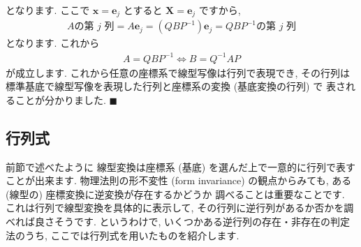 \documentclass[openany, a4paper, oneside]{book}
\theoremstyle{break}
\theoremstyle{breakdefn}
\newcommand{\bs}{\blacksquare}
\begin{document}
となります.
ここで $\bm{x} = \bm{e}_j$ とすると $\bm{X} = \bm{e}_j$ ですから,
    \begin{gather}
        A\text{の第 $j$ 列}
        =
        A \bm{e}_j
        =
        ( Q B P^{-1} ) \bm{e}_j
        =
        Q B P^{-1} \text{の第 $j$ 列}
    \end{gather}
となります.
これから
    \begin{gather}
        A
        =
        Q B P^{-1}
        \Longleftrightarrow
        B
        =
        Q^{-1} A P
    \label{eq:基底変換}
    \end{gather}
が成立します.
これから任意の座標系で線型写像は行列で表現でき,
その行列は標準基底で線型写像を表現した行列と座標系の変換 (基底変換の行列) で
表されることが分かりました.  $\bs$
\subsection{行列式}
\label{sec-4-3-2-4}

前節で述べたように
線型変換は座標系 (基底) を選んだ上で一意的に行列で表すことが出来ます.
物理法則の形不変性 (form invariance) の観点からみても, ある (線型の) 座標変換に逆変換が存在するかどうか
調べることは重要なことです.
これは行列で線型変換を具体的に表示して, その行列に逆行列があるか否かを調べれば良さそうです.
というわけで, いくつかある逆行列の存在・非存在の判定法のうち, ここでは行列式を用いたものを紹介します.
\end{document}

